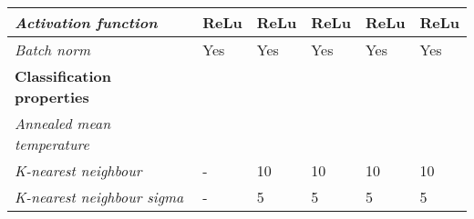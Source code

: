 \begin{table}[]
\begin{tabular}{|l|l|l|l|l|l|}
		\textit{Activation function}       & ReLu                                                              & ReLu                                                              & ReLu                                                              & ReLu                                                                                     & ReLu                                                                           \\ \hline
		\textit{Batch norm}                & Yes                                                               & Yes                                                               & Yes                                                               & Yes                                                                                      & Yes                                                                            \\ \hline
		\textbf{Classification properties} &                                                                   &                                                                   &                                                                   &                                                                                          &                                                                                \\ \hline
		\textit{Annealed mean temperature} &                                                                   &                                                                   &                                                                   &                                                                                          &                                                                                \\ \hline
		\textit{K-nearest neighbour}       & -                                                                 & 10                                                                & 10                                                                & 10                                                                                       & 10                                                                             \\ \hline
		\textit{K-nearest neighbour sigma} & -                                                                 & 5                                                                 & 5                                                                 & 5                                                                                        & 5                                                                              \\ \hline
	\end{tabular}
\end{table}
